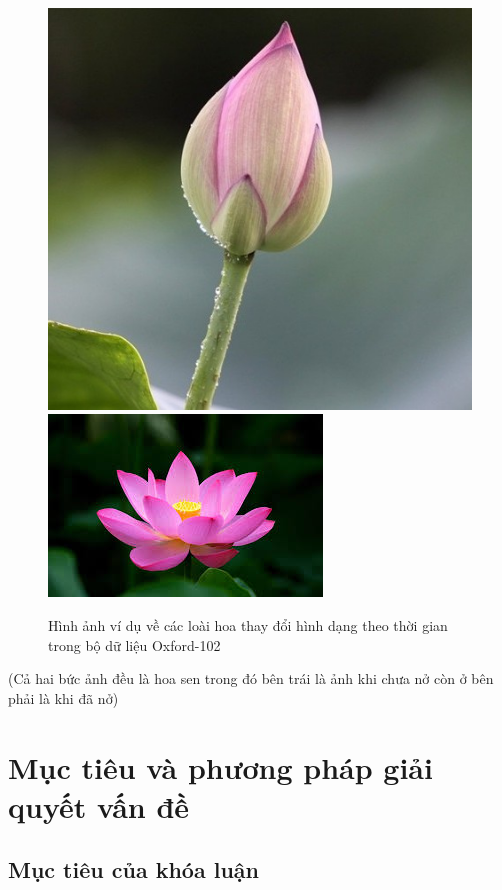 \documentclass[12pt]{report}
\begin{document}
		\begin{figure}[h]
			\centering
			\includegraphics[scale=0.35]{anh_5}
			\includegraphics[scale=0.88]{anh_6}
			\caption{Hình ảnh ví dụ về các loài hoa thay đổi hình dạng theo thời gian trong bộ dữ liệu Oxford-102 }
			\label{fig:anh_hoa_khacnhau_thoigian}
		\end{figure}
		(Cả hai bức ảnh đều là hoa sen trong đó bên trái là ảnh khi chưa nở còn ở bên phải là khi đã nở)
																																																																										
		\section{Mục tiêu và phương pháp giải quyết vấn đề}
		\subsection{Mục tiêu của khóa luận}
																																																																								
\end{document}
